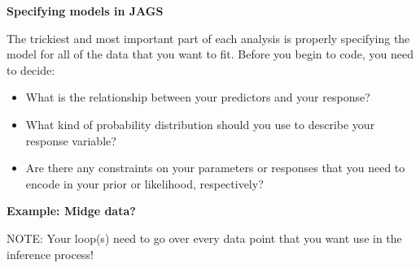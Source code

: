 \documentclass[12pt,xcolor=svgnames]{beamer}
\newcommand{\theme}{\color{FireBrick}}
\newcommand{\sk}{\vspace{.4cm}}
\newcommand{\chap}[1]{{\theme \Large \bf #1} \sk}
\begin{document}
\begin{frame}
\chap{Specifying models in JAGS}

The trickiest and most important part of each analysis is properly specifying the model for all of the data that you want to fit. Before you begin to code, you need to decide:
\begin{itemize}
\item What is the relationship between your predictors and your response?
\item What kind of probability distribution should you use to describe your response variable?
\item Are there any constraints on your parameters or responses that you need to encode in your prior or likelihood, respectively?
\end{itemize}

\end{frame}

\begin{frame}
\chap{Example: Midge data?}


NOTE: Your loop(s) need to go over every data point that you want use in the inference process!

\end{frame}
\end{document}
